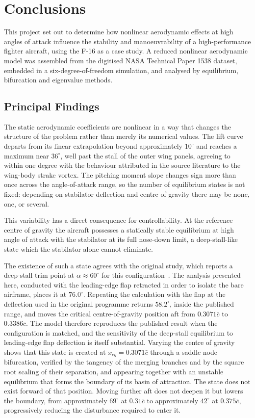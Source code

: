 \documentclass[
bindingoffset=5mm,  %
footnoteindent=3mm, %
hyphenation=true    %
]{src/wut-thesis}
\begin{document}
 
 \section{Conclusions}
 This project set out to determine how nonlinear aerodynamic effects at high
 angles of attack influence the stability and manoeuvrability of a
 high-performance fighter aircraft, using the F-16 as a case study. A reduced
 nonlinear aerodynamic model was assembled from the digitised NASA Technical
 Paper 1538 dataset, embedded in a six-degree-of-freedom simulation, and
 analysed by equilibrium, bifurcation and eigenvalue methods.
 
 
 \subsection{Principal Findings}
 
 The static aerodynamic coefficients are nonlinear in a way that changes the
 structure of the problem rather than merely its numerical values. The lift
 curve departs from its linear extrapolation beyond approximately $10^{\circ}$
 and reaches a maximum near $36^{\circ}$, well past the stall of the outer wing
 panels, agreeing to within one degree with the behaviour attributed in the
 source literature to the wing-body strake vortex. The pitching moment slope
 changes sign more than once across the angle-of-attack range, so the number of
 equilibrium states is not fixed: depending on stabilator deflection and centre
 of gravity there may be none, one, or several.
 
 This variability has a direct consequence for controllability.
 At the reference centre of gravity the aircraft possesses a statically stable
 equilibrium at high angle of attack with the stabilator at its full nose-down
 limit, a deep-stall-like state which the stabilator alone cannot eliminate.
 
 The existence of such a state agrees with the original study, which reports a
 deep-stall trim point at $\alpha \approx 60^{\circ}$ for this
 configuration~\cite{nguyen1979}. The analysis presented here, conducted with
 the leading-edge flap retracted in order to isolate the bare airframe, places
 it at $76.0^{\circ}$. Repeating the calculation with the flap at the
 deflection used in the original programme returns $58.2^{\circ}$, inside the
 published range, and moves the critical centre-of-gravity position aft from
 $0.3071\bar{c}$ to $0.3386\bar{c}$. The model therefore reproduces the
 published result when the configuration is matched, and the sensitivity of
 the deep-stall equilibrium to leading-edge flap deflection is itself
 substantial.
 Varying the centre of gravity shows that this state is created at
 $x_{cg} = 0.3071\bar{c}$ through a saddle-node bifurcation, verified by the
 tangency of the merging branches and by the square root scaling of their
 separation, and appearing together with an unstable equilibrium that forms the
 boundary of its basin of attraction. The state does not exist forward of that
 position. Moving further aft does not deepen it but lowers the boundary, from
 approximately $69^{\circ}$ at $0.31\bar{c}$ to approximately $42^{\circ}$ at
 $0.375\bar{c}$, progressively reducing the disturbance required to enter it.
 
\end{document}
